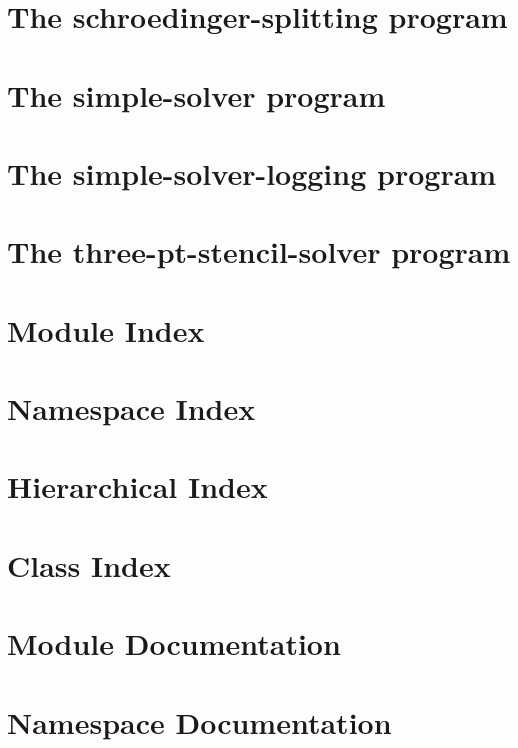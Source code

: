 \let\mypdfximage\pdfximage\def\pdfximage{\immediate\mypdfximage}\documentclass[twoside]{book}
\newcommand{\+}{\discretionary{\mbox{\scriptsize$\hookleftarrow$}}{}{}}
\begin{document}
\chapter{The schroedinger-\/splitting program}
\label{schroedinger_splitting}

\chapter{The simple-\/solver program}
\label{simple_solver}

\chapter{The simple-\/solver-\/logging program}
\label{simple_solver_logging}

\chapter{The three-\/pt-\/stencil-\/solver program}
\label{three_pt_stencil_solver}

\chapter{Module Index}

\chapter{Namespace Index}

\chapter{Hierarchical Index}

\chapter{Class Index}

\chapter{Module Documentation}














\chapter{Namespace Documentation}
















\end{document}
